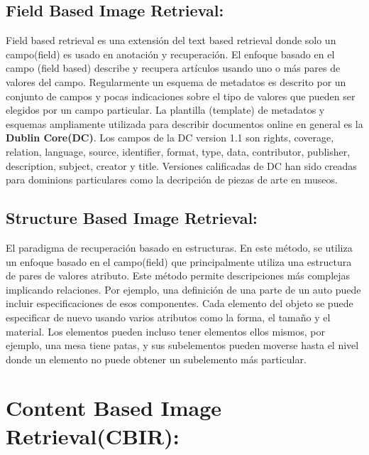 \documentclass{llncs}
\begin{document}
\subsection{Field Based Image Retrieval:}
Field based retrieval es una extensi\'on del text based retrieval donde solo un campo(field) es usado en anotaci\'on 
y recuperaci\'on. El enfoque basado en el campo (field based) describe y recupera art\'iculos usando uno o m\'as pares de valores 
del campo. Regularmente un esquema de metadatos es descrito por un conjunto de campos y pocas indicaciones sobre el tipo de
valores que pueden ser elegidos por un campo  particular. La plantilla (template) de metadatos y esquemas ampliamente utilizada para 
describir documentos online en general es la \textbf{Dublin Core(DC)}. Los campos de la DC version 1.1 son rights, coverage, relation,
language, source, identifier, format, type, data, contributor, publisher, description, subject, creator y title.  Versiones calificadas de 
DC han sido creadas para dominions particulares como la decripci\'on de piezas de arte en museos.

\subsection{Structure Based Image Retrieval:}

El paradigma de recuperaci\'on basado en estructuras. En este m\'etodo, se utiliza un enfoque basado en el campo(field) que principalmente
utiliza una estructura de pares de valores atributo. Este m\'etodo permite descripciones m\'as complejas implicando relaciones. Por ejemplo,
una definici\'on de una parte de un auto puede incluir especificaciones de esos componentes. Cada elemento del objeto se puede especificar 
de nuevo usando varios atributos como la forma, el tama\~{n}o y el material. Los elementos pueden incluso tener elementos ellos mismos, por 
ejemplo, una mesa tiene patas, y sus subelementos pueden moverse hasta el nivel donde un elemento no puede obtener un subelemento m\'as particular.


\section{Content Based Image Retrieval(CBIR):}
\end{document}

